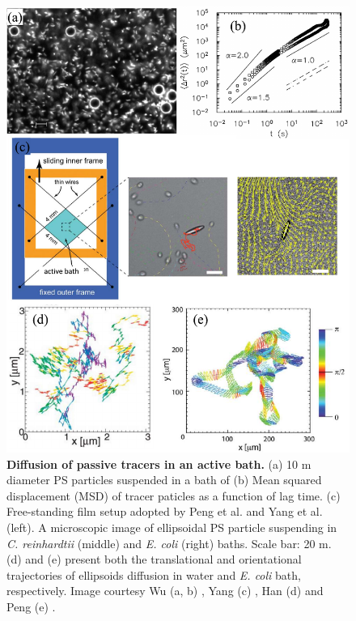\begin{figure}[!htbp]
	\begin{center}
	\includegraphics[width=5.5 in]{Figs/1-Intro/3.pdf}
	\end{center}
	\caption[Figure 1.3:]
	{
	\textbf{Diffusion of passive tracers in an active bath.}
	(a) 10 \textmu m diameter PS particles suspended in a bath of 
	(b) Mean squared displacement (MSD) of tracer paticles as a function of lag time.
	(c) Free-standing film setup adopted by Peng et al. and Yang et al. (left)\cite{Peng2016, Yang2016}. A microscopic image of ellipsoidal PS particle suspending in \textit{C. reinhardtii} (middle) and \textit{E. coli} (right) baths. Scale bar: 20 \textmu m.
	(d) and (e) present both the translational and orientational trajectories of ellipsoids diffusion in water and \textit{E. coli} bath, respectively.
	Image courtesy Wu (a, b) \cite{Wu2000}, Yang (c) \cite{Yang2016}, Han (d) \cite{Han2006} and Peng (e) \cite{Peng2016}.
	}
	\label{fig:diffusion-in-active-fluids}
\end{figure}

